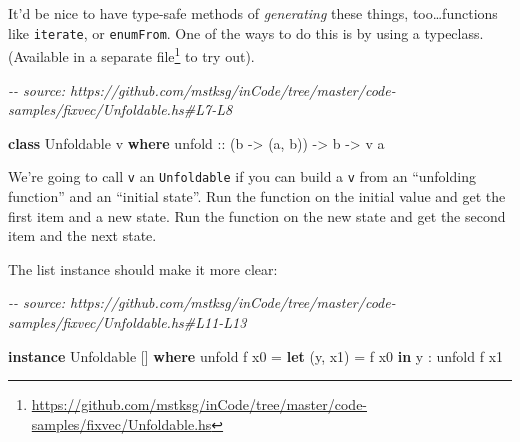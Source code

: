 \documentclass[]{article}
\newenvironment{Shaded}{}{}
\newcommand{\CommentTok}[1]{\textcolor[rgb]{0.38,0.63,0.69}{\textit{#1}}}
\newcommand{\DataTypeTok}[1]{\textcolor[rgb]{0.56,0.13,0.00}{#1}}
\newcommand{\DecValTok}[1]{\textcolor[rgb]{0.25,0.63,0.44}{#1}}
\newcommand{\FunctionTok}[1]{\textcolor[rgb]{0.02,0.16,0.49}{#1}}
\newcommand{\KeywordTok}[1]{\textcolor[rgb]{0.00,0.44,0.13}{\textbf{#1}}}
\newcommand{\NormalTok}[1]{#1}
\newcommand{\OperatorTok}[1]{\textcolor[rgb]{0.40,0.40,0.40}{#1}}
\newcommand{\OtherTok}[1]{\textcolor[rgb]{0.00,0.44,0.13}{#1}}
\renewcommand{\href}[2]{#2\footnote{\url{#1}}}
\begin{document}
It'd be nice to have type-safe methods of \emph{generating} these things,
too\ldots functions like \texttt{iterate}, or \texttt{enumFrom}. One of the ways
to do this is by using a typeclass. (Available in a
\href{https://github.com/mstksg/inCode/tree/master/code-samples/fixvec/Unfoldable.hs}{separate
file} to try out).

\begin{Shaded}
\begin{Highlighting}[]
\CommentTok{{-}{-} source: https://github.com/mstksg/inCode/tree/master/code{-}samples/fixvec/Unfoldable.hs\#L7{-}L8}

\KeywordTok{class} \DataTypeTok{Unfoldable}\NormalTok{ v }\KeywordTok{where}
\OtherTok{    unfold ::}\NormalTok{ (b }\OtherTok{{-}\textgreater{}}\NormalTok{ (a, b)) }\OtherTok{{-}\textgreater{}}\NormalTok{ b }\OtherTok{{-}\textgreater{}}\NormalTok{ v a}
\end{Highlighting}
\end{Shaded}

We're going to call \texttt{v} an \texttt{Unfoldable} if you can build a
\texttt{v} from an ``unfolding function'' and an ``initial state''. Run the
function on the initial value and get the first item and a new state. Run the
function on the new state and get the second item and the next state.

The list instance should make it more clear:

\begin{Shaded}
\begin{Highlighting}[]
\CommentTok{{-}{-} source: https://github.com/mstksg/inCode/tree/master/code{-}samples/fixvec/Unfoldable.hs\#L11{-}L13}

\KeywordTok{instance} \DataTypeTok{Unfoldable}\NormalTok{ [] }\KeywordTok{where}
\NormalTok{    unfold f x0 }\OtherTok{=} \KeywordTok{let}\NormalTok{ (y, x1) }\OtherTok{=}\NormalTok{ f x0}
                  \KeywordTok{in}\NormalTok{  y }\OperatorTok{:}\NormalTok{ unfold f x1}
\end{Highlighting}
\end{Shaded}

\begin{Shaded}
\end{Shaded}
\end{document}
